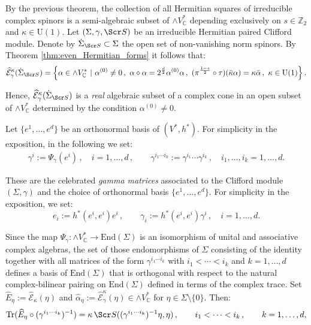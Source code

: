 \documentclass[10pt,a4paper,twoside,reqno]{amsart}
\theoremstyle{plain}
\theoremstyle{definition}
\theoremstyle{remark}
\newcommand{\End}{\mathrm{End}}
\def\C{\mathbb{C}}
\newcommand{\Tr}{\mathrm{Tr}}
\def\scS{\Scr S}
\def\U{\mathrm{U}}
\def\hcE{\widehat{\mathcal{E}}}
\begin{document}
\noindent
By the previous theorem, the collection of all Hermitian squares of irreducible complex spinors is a semi-algebraic subset of $\wedge V^{\ast}_{\C}$ depending exclusively on $s\in \mathbb{Z}_2$ and $\kappa \in \U(1)$. Let $(\Sigma,\gamma,\scS)$ be an irreducible Hermitian paired Clifford module. Denote by $\dot{\Sigma}_{\scS} \subset \Sigma$ the open set of non-vanishing norm spinors. By Theorem \ref{thm:even_Hermitian_forms} it follows that:
\begin{equation*}
\hcE_\gamma^\kappa(\dot{\Sigma}_{\scS}) = \left\{ \alpha\in \wedge V^{\ast}_{\C} \,\, \vert\,\, \alpha^{(0)} \neq 0\, ,  \,\, \alpha\diamond\alpha = 2^{\frac{d}{2}}\alpha^{(0)}\alpha\, , \,\, (\pi^{\frac{1-s}{2}}\circ\tau)(\bar\kappa\alpha) = \kappa \bar{\alpha}\, , \,\, \kappa \in \U(1) \right\}.
\end{equation*}

\noindent
Hence, $\hcE_\gamma^\kappa(\dot{\Sigma}_{\scS})$ is a \emph{real} algebraic subset of a complex cone in an open subset of $\wedge V^{\ast}_{\C}$ determined by the condition $\alpha^{(0)} \neq 0$.\medskip

\noindent
Let $\{e^1, \hdots , e^d\}$ be an orthonormal basis of $(V^{\ast} , h^{\ast})$. For simplicity in the exposition, in the following we set:
\begin{eqnarray*}
\gamma^i := \Psi_{\gamma}(e^i)\, , \quad i= 1,\hdots , d\, , \qquad \gamma^{i_1\cdots i_k} := \gamma^{i_1} \cdots \gamma^{i_k} \, , \quad i_1, \hdots , i_k = 1, \hdots , d.
\end{eqnarray*}

\noindent
These are the celebrated \emph{gamma matrices} associated to the Clifford module $(\Sigma,\gamma)$ and the choice of orthonormal basis $\{e^1, \hdots , e^d\}$. For simplicity in the exposition, we set:
\begin{equation*}
e_i := h^{\ast}(e^i , e^i) e^i \, , \qquad \gamma_i := h^{\ast}(e^i , e^i) \gamma^i\, , \quad i= 1,\hdots , d.
\end{equation*}

\noindent
Since the map $\Psi_{\gamma} \colon \wedge V^{\ast}_{\C} \to \End(\Sigma)$ is an isomorphism of unital and associative complex algebras, the set of those endomorphisms of $\Sigma$ consisting of the identity together with all matrices of the form $\gamma^{i_1\cdots i_k}$ with $i_1 < \cdots < i_k$ and $k=1,\hdots , d$ defines a basis of $\End(\Sigma)$ that is orthogonal with respect to the natural complex-bilinear pairing on $\End(\Sigma)$ defined in terms of the complex trace. Set $\widehat{E}_{\eta} := \hcE_{\kappa}(\eta)$ and $\widehat{\alpha}_{\eta} := \hcE^{\kappa}_{\gamma}(\eta) \in \wedge V^{\ast}_{\C}$ for $\eta \in \Sigma\setminus\{ 0 \}$. Then:
\begin{eqnarray*}
\Tr(\widehat{E}_{\eta} \circ (\gamma^{i_1 \cdots i_k})^{-1}) = \kappa \, \scS((\gamma^{i_1 \cdots i_k})^{-1}\eta , \eta)\, , \qquad  i_1 < \cdots < i_k \, , \qquad k=1,\hdots , d,
\end{eqnarray*}
\end{document}
